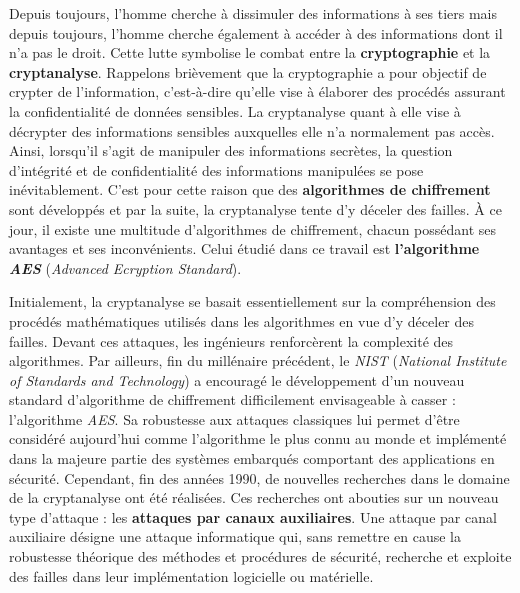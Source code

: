 \documentclass[oneside]{book}
\begin{document}
Depuis toujours, l’homme cherche à dissimuler des informations à ses tiers mais depuis toujours, l’homme cherche également à accéder à des informations dont il n’a pas le droit. Cette lutte symbolise le combat entre la \textbf{cryptographie} et la \textbf{cryptanalyse}. Rappelons brièvement que la cryptographie a pour objectif de crypter de l’information, c’est-à-dire qu’elle vise à élaborer des procédés assurant la confidentialité de données sensibles. La cryptanalyse quant à elle vise à décrypter des informations sensibles auxquelles elle n'a normalement pas accès. Ainsi, lorsqu'il s'agit de manipuler des informations secrètes, la question d'intégrité et de confidentialité des informations manipulées se pose inévitablement. C'est pour cette raison que des \textbf{algorithmes de chiffrement} sont développés et par la suite, la cryptanalyse tente d'y déceler des failles. À ce jour, il existe une multitude d'algorithmes de chiffrement, chacun possédant ses avantages et ses inconvénients. Celui étudié dans ce travail est \textbf{l'algorithme \textit{AES}} (\textit{Advanced Ecryption Standard}).

Initialement, la cryptanalyse se basait essentiellement sur la compréhension des procédés mathématiques utilisés dans les algorithmes en vue d'y déceler des failles. Devant ces attaques, les ingénieurs renforcèrent la complexité des algorithmes. Par ailleurs, fin du millénaire précédent, le \textit{NIST} (\textit{National Institute of Standards and Technology}) a encouragé le développement d’un nouveau standard d’algorithme de chiffrement difficilement envisageable à casser : l’algorithme \textit{AES}. Sa robustesse aux attaques classiques lui permet d'être considéré aujourd’hui comme l'algorithme le plus connu au monde et implémenté dans la majeure partie des systèmes embarqués comportant des applications en sécurité. Cependant, fin des années 1990, de nouvelles recherches dans le domaine de la cryptanalyse ont été réalisées. Ces recherches ont abouties sur un nouveau type d'attaque : les \textbf{attaques par canaux auxiliaires}. Une attaque par canal auxiliaire désigne une attaque informatique qui, sans remettre en cause la robustesse théorique des méthodes et procédures de sécurité, recherche et exploite des failles dans leur implémentation logicielle ou matérielle. 
\end{document}
